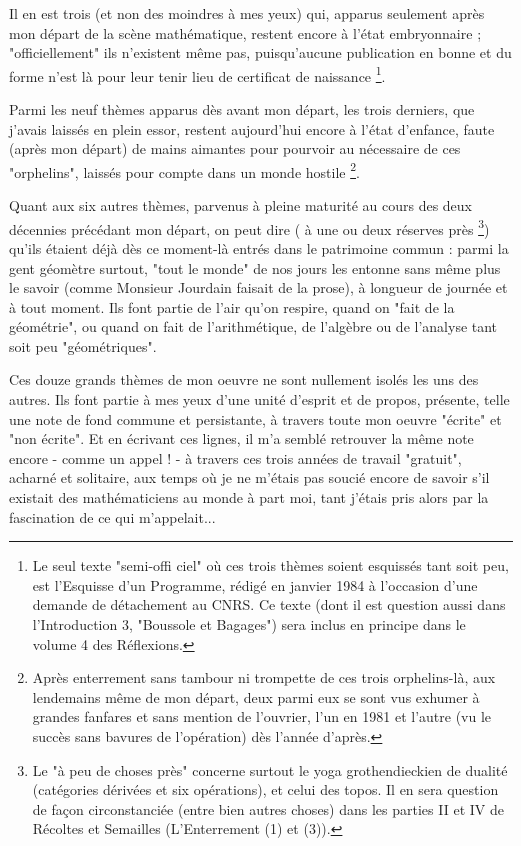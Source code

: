 Il en est trois (et non des moindres à mes yeux) qui, apparus seulement après mon départ de la scène mathématique, restent encore à l'état embryonnaire ; "officiellement" ils n'existent même pas, puisqu'aucune publication en bonne et du forme n'est là pour leur tenir lieu de certificat de naissance \footnote{Le seul texte "semi-offi ciel" où ces trois thèmes soient esquissés tant soit peu, est l'Esquisse d'un Programme, rédigé en janvier 1984 à l'occasion d'une demande de détachement au CNRS. Ce texte (dont il est question aussi dans l'Introduction 3, "Boussole et Bagages") sera inclus en principe dans le volume 4 des Réflexions.}.

Parmi les neuf thèmes apparus dès avant mon départ, les trois derniers, que j'avais laissés en plein essor, restent aujourd'hui encore à l'état d'enfance, faute (après mon départ) de mains aimantes pour pourvoir au nécessaire de ces "orphelins", laissés pour compte dans un monde hostile \footnote{Après enterrement sans tambour ni trompette de ces trois orphelins-là, aux lendemains même de mon départ, deux parmi eux se sont vus exhumer à grandes fanfares et sans mention de l'ouvrier, l'un en 1981 et l'autre (vu le succès sans bavures de l'opération) dès l'année d'après.}.

Quant aux six autres thèmes, parvenus à pleine maturité au cours des deux décennies précédant mon départ, on peut dire ( à une ou deux réserves près \footnote{Le "à peu de choses près" concerne surtout le yoga grothendieckien de dualité (catégories dérivées et six opérations), et celui des topos. Il en sera question de façon circonstanciée (entre bien autres choses) dans les parties II et IV de Récoltes et Semailles (L'Enterrement (1) et (3)).}) qu'ils étaient déjà dès ce moment-là entrés dans le patrimoine commun : parmi la gent géomètre surtout, "tout le monde" de nos jours les entonne sans même plus le savoir (comme Monsieur Jourdain faisait de la prose), à longueur de journée et à tout moment. Ils font partie de l'air qu'on respire, quand on "fait de la géométrie", ou quand on fait de l'arithmétique, de l'algèbre ou de l'analyse tant soit peu "géométriques".

Ces douze grands thèmes de mon oeuvre ne sont nullement isolés les uns des autres. Ils font partie à mes yeux d'une unité d'esprit et de propos, présente, telle une note de fond commune et persistante, à travers toute mon oeuvre "écrite" et "non écrite". Et en écrivant ces lignes, il m’a semblé retrouver la même note encore - comme un appel ! - à travers ces trois années de travail "gratuit", acharné et solitaire, aux temps où je ne m'étais pas soucié encore de savoir s'il existait des mathématiciens au monde à part moi, tant j'étais pris alors par la fascination de ce qui m'appelait...


